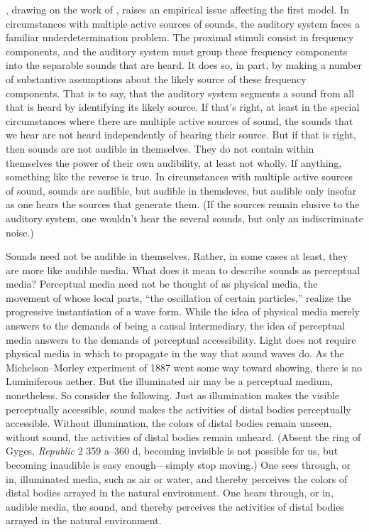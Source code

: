 \documentclass[12pt]{article}
\begin{document}
\citet{Nudds:2009sf}, drawing on the work of \citet[chapter 4]{Bregman:1990aa}, raises an empirical issue affecting the first model. In circumstances with multiple active sources of sounds, the auditory system faces a familiar underdetermination problem. The proximal stimuli consist in frequency components, and the auditory system must group these frequency components into the separable sounds that are heard. It does so, in part, by making a number of substantive assumptions about the likely source of these frequency components. That is to say, that the auditory system segments a sound from all that is heard by identifying its likely source. If that's right, at least in the special circumstances where there are multiple active sources of sound, the sounds that we hear are not heard independently of hearing their source. But if that is right, then sounds are not audible in themselves. They do not contain within themselves the power of their own audibility, at least not wholly. If anything, something like the reverse is true. In circumstances with multiple active sources of sound, sounds are audible, but audible in themsleves, but audible only insofar as one hears the sources that generate them. (If the sources remain elusive to the auditory system, one wouldn't hear the several sounds, but only an indiscriminate noise.) 

Sounds need not be audible in themselves. Rather, in some cases at least, they are more like audible media. What does it mean to describe sounds as perceptual media? Perceptual media need not be thought of as physical media, the movement of whose local parts, ``the oscillation of certain particles,'' realize the progressive instantiation of a wave form. While the idea of physical media merely answers to the demands of being a causal intermediary, the idea of perceptual media answers to the demands of perceptual accessibility. Light does not require physical media in which to propagate in the way that sound waves do. As the Michelson–Morley experiment of 1887 went some way toward showing, there is no Luminiferous aether. But the illuminated air may be a perceptual medium, nonetheless. So consider the following. Just as illumination makes the visible perceptually accessible, sound makes the activities of distal bodies perceptually accessible. Without illumination, the colors of distal bodies remain unseen, without sound, the activities of distal bodies remain unheard. (Absent the ring of Gyges, \emph{Republic} 2 359 a–360 d, becoming invisible is not possible for us, but becoming inaudible is easy enough---simply stop moving.) One sees through, or in, illuminated media, such as air or water, and thereby perceives the colors of distal bodies arrayed in the natural environment. One hears through, or in, audible media, the sound, and thereby perceives the activities of distal bodies arrayed in the natural environment.
\end{document}
